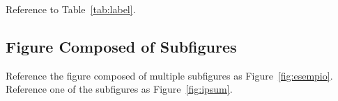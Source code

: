 \documentclass[
10pt, %
a4paper, %
oneside, %
headinclude,footinclude, %
BCOR5mm, %
]{scrartcl}
\begin{document}
Reference to Table~\vref{tab:label}. %


\subsection{Figure Composed of Subfigures}

Reference the figure composed of multiple subfigures as Figure~\vref{fig:esempio}. Reference one of the subfigures as Figure~\vref{fig:ipsum}. %



\renewcommand{\refname}{\spacedlowsmallcaps{References}} %














\end{document}
